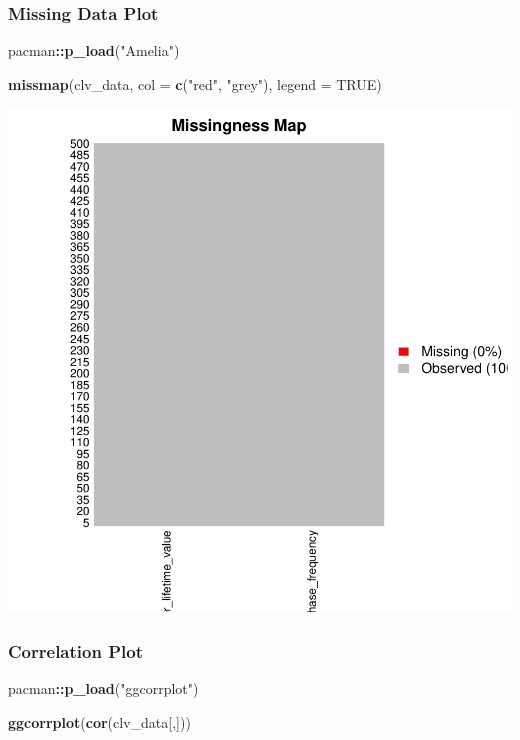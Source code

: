 \documentclass[
]{article}
\newenvironment{Shaded}{\begin{snugshade}}{\end{snugshade}}
\newcommand{\AttributeTok}[1]{\textcolor[rgb]{0.13,0.29,0.53}{#1}}
\newcommand{\ConstantTok}[1]{\textcolor[rgb]{0.56,0.35,0.01}{#1}}
\newcommand{\FunctionTok}[1]{\textcolor[rgb]{0.13,0.29,0.53}{\textbf{#1}}}
\newcommand{\NormalTok}[1]{#1}
\newcommand{\SpecialCharTok}[1]{\textcolor[rgb]{0.81,0.36,0.00}{\textbf{#1}}}
\newcommand{\StringTok}[1]{\textcolor[rgb]{0.31,0.60,0.02}{#1}}
\begin{document}
\subsubsection{\texorpdfstring{\textbf{Missing Data
Plot}}{Missing Data Plot}}\label{missing-data-plot}

\begin{Shaded}
\begin{Highlighting}[]
\NormalTok{pacman}\SpecialCharTok{::}\FunctionTok{p\_load}\NormalTok{(}\StringTok{"Amelia"}\NormalTok{)}

\FunctionTok{missmap}\NormalTok{(clv\_data, }\AttributeTok{col =} \FunctionTok{c}\NormalTok{(}\StringTok{"red"}\NormalTok{, }\StringTok{"grey"}\NormalTok{), }\AttributeTok{legend =} \ConstantTok{TRUE}\NormalTok{)}
\end{Highlighting}
\end{Shaded}

\includegraphics{1_simple_linear_regression_files/figure-latex/missing_data_plot-1.pdf}

\subsubsection{\texorpdfstring{\textbf{Correlation
Plot}}{Correlation Plot}}\label{correlation-plot}

\begin{Shaded}
\begin{Highlighting}[]
\NormalTok{pacman}\SpecialCharTok{::}\FunctionTok{p\_load}\NormalTok{(}\StringTok{"ggcorrplot"}\NormalTok{)}

\FunctionTok{ggcorrplot}\NormalTok{(}\FunctionTok{cor}\NormalTok{(clv\_data[,]))}
\end{Highlighting}
\end{Shaded}
\end{document}
